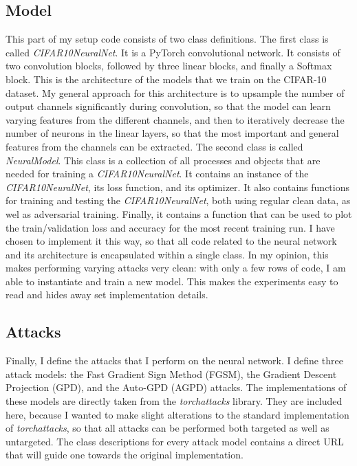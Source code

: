 \documentclass{article}
\begin{document}
\subsection{Model}
This part of my setup code consists of two class definitions. The first class is called \textit{CIFAR10NeuralNet}.
It is a PyTorch convolutional network.
It consists of two convolution blocks, followed by three linear blocks, and finally a Softmax block.
This is the architecture of the models that we train on the CIFAR-10 dataset.
My general approach for this architecture is to upsample the number of output channels significantly during convolution, so that the model can learn varying features from the different channels, and then to iteratively decrease the number of neurons in the linear layers, so that the most important and general features from the channels can be extracted.
The second class is called \textit{NeuralModel}.
This class is a collection of all processes and objects that are needed for training a \textit{CIFAR10NeuralNet}.
It contains an instance of the \textit{CIFAR10NeuralNet}, its loss function, and its optimizer.
It also contains functions for training and testing the \textit{CIFAR10NeuralNet}, both using regular clean data, as wel as adversarial training.
Finally, it contains a function that can be used to plot the train/validation loss and accuracy for the most recent training run.
I have chosen to implement it this way, so that all code related to the neural network and its architecture is encapsulated within a single class.
In my opinion, this makes performing varying attacks very clean: with only a few rows of code, I am able to instantiate and train a new model.
This makes the experiments easy to read and hides away set implementation details.

\subsection{Attacks}
Finally, I define the attacks that I perform on the neural network.
I define three attack models: the Fast Gradient Sign Method (FGSM), the Gradient Descent Projection (GPD), and the Auto-GPD (AGPD) attacks.
The implementations of these models are directly taken from the \textit{torchattacks} library.
They are included here, because I wanted to make slight alterations to the standard implementation of \textit{torchattacks}, so that all attacks can be performed both targeted as well as untargeted.
The class descriptions for every attack model contains a direct URL that will guide one towards the original implementation.
\end{document}
